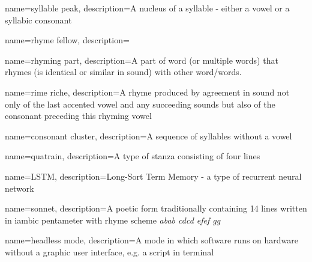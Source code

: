 
{
	name=syllable peak,
	description={A nucleus of a syllable - either a vowel or a syllabic consonant}
}

{
	name=rhyme fellow,
	description={}
}

{
	name=rhyming part,
	description={A part of word (or multiple words) that rhymes (is identical or similar in sound) with other word/words.}
}


{
	name=rime riche,
	description={A rhyme produced by agreement in sound not only of the last accented vowel and any succeeding sounds but also of the consonant preceding this rhyming vowel}
}


{
	name=consonant cluster,
	description={A sequence of syllables without a vowel}
}

{
	name=quatrain,
	description={A type of stanza consisting of four lines}
}

{
	name=LSTM,
	description={Long-Sort Term Memory - a type of recurrent neural network}
}

{
	name=sonnet,
	description={A poetic form traditionally containing 14 lines written in iambic pentameter with rhyme scheme \textit{abab cdcd efef gg}}
}

{
	name=headless mode,
	description={A mode in which software runs on hardware without a graphic user interface, e.g. a script in terminal}
}